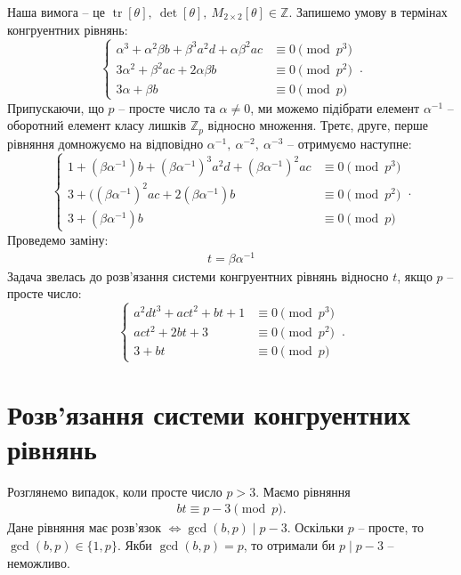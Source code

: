 \documentclass{thesis}
\DeclareMathOperator{\tr}{tr}
\begin{document}
Наша вимога -- це $\tr [\theta],\ \det [\theta],\ M_{2 \times 2}[\theta] \in \mathbb{Z}$. Запишемо умову в термінах конгруентних рівнянь:
\begin{equation}
    \begin{cases}
      \alpha^3 + \alpha^2 \beta b + \beta^3 a^2 d + \alpha \beta^2 a c & \equiv 0 \pmod {p^3} \\
    3\alpha^2 + \beta^2 ac + 2 \alpha \beta b & \equiv 0 \pmod {p^2} \\
      3 \alpha + \beta b & \equiv 0 \pmod p 
    \end{cases}\,.
\end{equation}
Припускаючи, що $p$ -- просте число та $\alpha \neq 0$, ми можемо підібрати елемент $\alpha^{-1}$ -- оборотний елемент класу лишків $\mathbb{Z}_p$ відносно множення. Третє, друге, перше рівняння домножуємо на відповідно $\alpha^{-1},\ \alpha^{-2},\ \alpha^{-3}$ -- отримуємо наступне:
\begin{equation*}
    \begin{cases}
      1 + (\beta \alpha^{-1}) b + (\beta \alpha^{-1})^{3} a^2 d + (\beta \alpha^{-1})^2 a c & \equiv 0 \pmod {p^3} \\
    3 + ((\beta \alpha^{-1})^2 ac + 2 (\beta \alpha^{-1}) b & \equiv 0 \pmod {p^2} \\
      3 + (\beta \alpha^{-1})b & \equiv 0 \pmod p 
    \end{cases}\,.
\end{equation*}
Проведемо заміну:
\begin{align}
t = \beta \alpha^{-1}
\end{align}
Задача звелась до розв'язання системи конгруентних рівнянь відносно $t$, якщо $p$ -- просте число: 
\begin{equation}
\label{system_congruent_equations}
    \begin{cases}
      a^2 d t^3 + ac t^2 + bt + 1 & \equiv 0 \pmod {p^3} \\
      act^2 + 2bt + 3 & \equiv 0 \pmod {p^2} \\
      3 + bt & \equiv 0 \pmod p 
    \end{cases}\,.
\end{equation}

\section{Розв'язання системи конгруентних рівнянь}
Розглянемо випадок, коли просте число $p > 3$. Маємо рівняння
\begin{align*}
bt \equiv p-3 \pmod p.
\end{align*}
Дане рівняння має розв'язок $\iff \gcd(b,p) \mid p-3$. Оскільки $p$ -- просте, то $\gcd(b,p) \in \{1,p\}$. Якби $\gcd(b,p) = p$, то отримали би $p \mid p-3$ -- неможливо.
\end{document}
